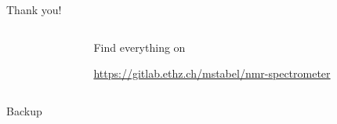 \documentclass{ethpresentation}
\begin{document}
\begin{frame}{Thank you!}
  \begin{columns}
    \begin{column}{0.5\textwidth}
      \centering
      
    \end{column}
    \begin{column}{0.5\textwidth}
      \centering
      Find everything on \\ \vspace*{\baselineskip}

      

      \url{https://gitlab.ethz.ch/mstabel/nmr-spectrometer}
    \end{column}
  \end{columns}
\end{frame}



\appendix

\begin{frame}[standout]
  Backup
\end{frame}
\end{document}
